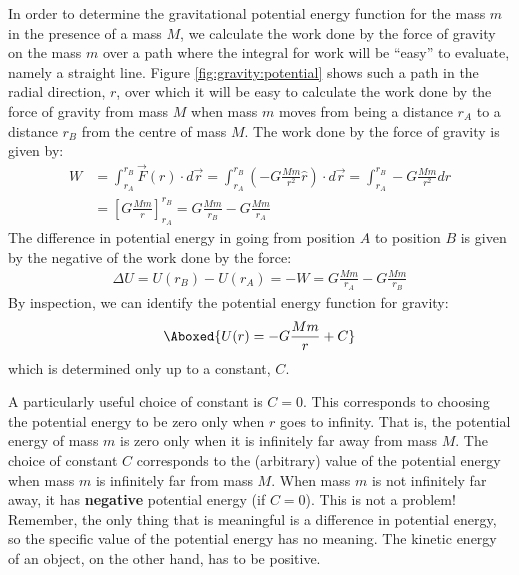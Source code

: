 In order to determine the gravitational potential energy function for the mass $m$ in the presence of a mass $M$, we calculate the work done by the force of gravity on the mass $m$ over a path where the integral for work will be ``easy'' to evaluate, namely a straight line. Figure \ref{fig:gravity:potential} shows such a path in the radial direction, $r$, over which it will be easy to calculate the work done by the force of gravity from mass $M$ when mass $m$ moves from being a distance $r_A$ to a distance $r_B$ from the centre of mass $M$.
The work done by the force of gravity is given by:
\begin{align*}
W &= \int_{r_A}^{r_B}\vec F(r) \cdot d\vec r = \int_{r_A}^{r_B} \left(- G\frac{Mm}{r^2}\hat r \right)\cdot d\vec r =\int_{r_A}^{r_B} - G\frac{Mm}{r^2}dr\\
&=\left[G\frac{Mm}{r} \right]_{r_A}^{r_B} =G\frac{Mm}{r_B} - G\frac{Mm}{r_A}
\end{align*}
The difference in potential energy in going from position $A$ to position $B$ is given by the negative of the work done by the force:
\begin{align*}
\Delta U = U(r_B) - U(r_A) = -W = G\frac{Mm}{r_A} - G\frac{Mm}{r_B}
\end{align*}
By inspection, we can identify the potential energy function for gravity:
\begin{align}
\Aboxed{U(r) = -G\frac{Mm}{r} + C}
\end{align}
which is determined only up to a constant, $C$. 

A particularly useful choice of constant is $C=0$. This corresponds to choosing the potential energy to be zero only when $r$ goes to infinity. That is, the potential energy of mass $m$ is zero only when it is infinitely far away from mass $M$. The choice of constant $C$ corresponds to the (arbitrary) value of the potential energy when mass $m$ is infinitely far from mass $M$. When mass $m$ is not infinitely far away, it has \textbf{negative} potential energy (if $C=0$). This is not a problem! Remember, the only thing that is meaningful is a difference in potential energy, so the specific value of the potential energy has no meaning. The kinetic energy of an object, on the other hand, has to be positive.

